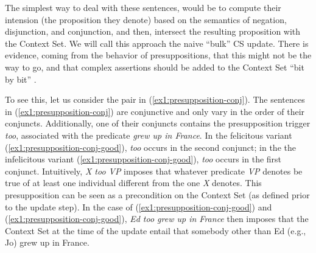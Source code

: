 The simplest way to deal with these sentences, would be to compute their intension (the proposition they denote) based on the semantics of negation, disjunction, and conjunction, and then, intersect the resulting proposition with the Context Set. We will call this approach the naive ``bulk'' CS update. There is evidence, coming from the behavior of presuppositions, that this might not be the way to go, and that complex assertions should be added to the Context Set ``bit by bit'' \parencite{Heim1982,Heim1983a,Heim1983b}.

To see this, let us consider the pair in (\ref{ex1:presupposition-conj}). The sentences in (\ref{ex1:presupposition-conj}) are conjunctive and only vary in the order of their conjuncts. Additionally, one of their conjuncts contains the presupposition trigger \textit{too}, associated with the predicate \textit{grew up in France}. In the felicitous variant (\ref{ex1:presupposition-conj-good}), \textit{too} occurs in the second conjunct; in the the infelicitous variant (\ref{ex1:presupposition-conj-good}), \textit{too} occurs in the first conjunct. Intuitively, \textit{X too VP} imposes that whatever predicate \textit{VP} denotes be true of at least one individual different from the one \textit{X} denotes. This presupposition can be seen as a precondition on the Context Set (as defined prior to the update step). In the case of (\ref{ex1:presupposition-conj-good}) and (\ref{ex1:presupposition-conj-good}), \textit{Ed too grew up in France} then imposes that the Context Set at the time of the update entail that somebody other than Ed (e.g., Jo) grew up in France. 

\begin{exe}
	\ex \label{ex1:presupposition-conj}
	\begin{xlist}
		\label{ex1:presupposition-conj-good}
		\label{ex1:presupposition-conj-bad}
	\end{xlist}
\end{exe}

